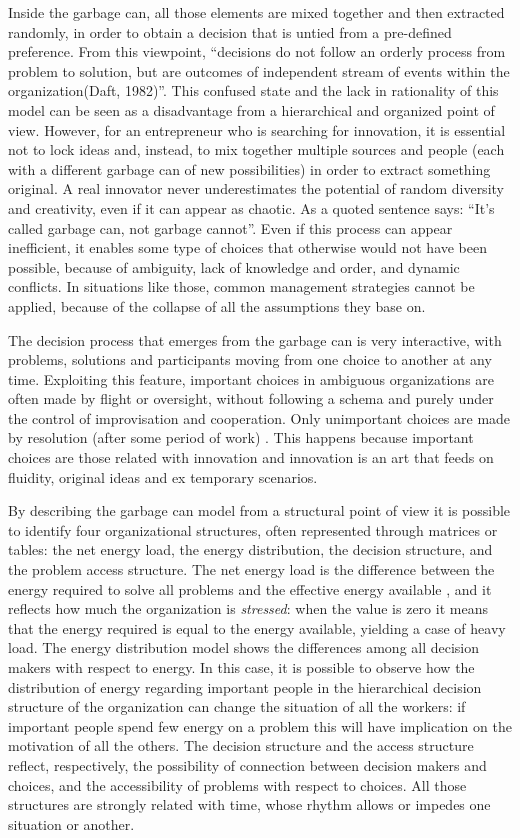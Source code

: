 Inside the garbage can, all those elements are mixed together and then extracted randomly, in order to obtain a decision that is untied from a pre-defined preference. From this viewpoint, ``decisions do not follow an orderly process from problem to solution, but are outcomes of independent stream of events within the organization(Daft, 1982)''\cite{3}. This confused state and the lack in rationality of this model can be seen as a disadvantage from a hierarchical and organized point of view. However, for an entrepreneur who is searching for innovation, it is essential not to lock ideas and, instead, to mix together multiple sources and people (each with a different garbage can of new possibilities) in order to extract something original. A real innovator never underestimates the potential of random diversity and creativity, even if it can appear as chaotic. As a quoted sentence says: ``It’s called garbage can, not garbage cannot''. Even if this process can appear inefficient, it enables some type of choices that otherwise would not have been possible, because of ambiguity, lack of knowledge and order, and dynamic conflicts. In situations like those, common management strategies cannot be applied, because of the collapse of all the assumptions they base on.

The decision process that emerges from the garbage can is very interactive, with problems, solutions and participants moving from one choice to another at any time. Exploiting this feature, important choices in ambiguous organizations are often made by flight or oversight, without following a schema and purely under the control of improvisation and cooperation. Only unimportant choices are made by resolution (after some period of work) \cite{1}. This happens because important choices are those related with innovation and innovation is an art that feeds on fluidity, original ideas and ex temporary scenarios.

By describing the garbage can model from a structural point of view it is possible to identify four organizational structures, often represented through matrices or tables: the net energy load, the energy distribution, the decision structure, and the problem access structure. The net energy load is the difference between the energy required to solve all problems and the effective energy available \cite{1}, and it reflects how much the organization is \textit{stressed}: when the value is zero it means that the energy required is equal to the energy available, yielding a case of heavy load. The energy distribution model shows the differences among all decision makers with respect to energy. In this case, it is possible to observe how the distribution of energy regarding important people in the hierarchical decision structure of the organization can change the situation of all the workers: if important people spend few energy on a problem this will have implication on the motivation of all the others. The decision structure and the access structure reflect, respectively, the possibility of connection between decision makers and choices, and the accessibility of problems with respect to choices. All those structures are strongly related with time, whose rhythm allows or impedes one situation or another.

